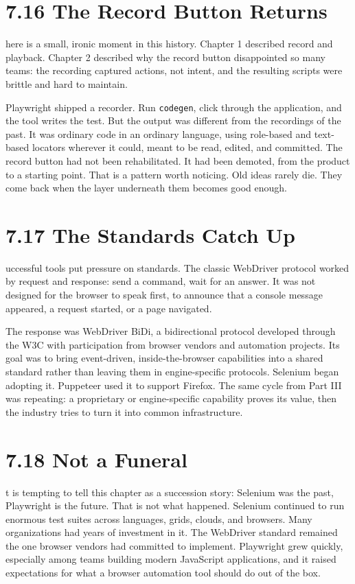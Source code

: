 \documentclass[11pt, a4paper, openany]{book}
\newcommand{\initialcap}[1]{{\fontfamily{lmss}\selectfont\huge\textbf{#1}}}
\begin{document}
\section{7.16 The Record Button Returns}
\noindent \initialcap{T}here is a small, ironic moment in this history. Chapter 1 described record and playback. Chapter 2 described why the record button disappointed so many teams: the recording captured actions, not intent, and the resulting scripts were brittle and hard to maintain.

Playwright shipped a recorder. Run \texttt{codegen}, click through the application, and the tool writes the test. But the output was different from the recordings of the past. It was ordinary code in an ordinary language, using role-based and text-based locators wherever it could, meant to be read, edited, and committed. The record button had not been rehabilitated. It had been demoted, from the product to a starting point. That is a pattern worth noticing. Old ideas rarely die. They come back when the layer underneath them becomes good enough.

\section{7.17 The Standards Catch Up}
\noindent \initialcap{S}uccessful tools put pressure on standards. The classic WebDriver protocol worked by request and response: send a command, wait for an answer. It was not designed for the browser to speak first, to announce that a console message appeared, a request started, or a page navigated.

The response was WebDriver BiDi, a bidirectional protocol developed through the W3C with participation from browser vendors and automation projects. Its goal was to bring event-driven, inside-the-browser capabilities into a shared standard rather than leaving them in engine-specific protocols. Selenium began adopting it. Puppeteer used it to support Firefox. The same cycle from Part III was repeating: a proprietary or engine-specific capability proves its value, then the industry tries to turn it into common infrastructure.

\section{7.18 Not a Funeral}
\noindent \initialcap{I}t is tempting to tell this chapter as a succession story: Selenium was the past, Playwright is the future. That is not what happened. Selenium continued to run enormous test suites across languages, grids, clouds, and browsers. Many organizations had years of investment in it. The WebDriver standard remained the one browser vendors had committed to implement. Playwright grew quickly, especially among teams building modern JavaScript applications, and it raised expectations for what a browser automation tool should do out of the box.
\end{document}
